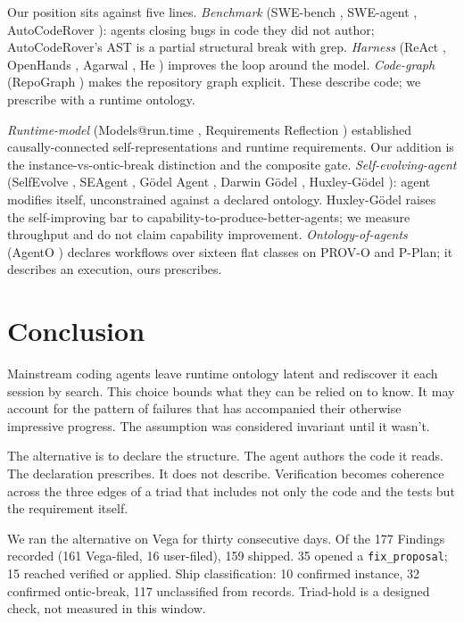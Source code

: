 \documentclass[conference,10pt]{IEEEtran}
\begin{document}
Our position sits against five lines. \emph{Benchmark} (SWE-bench
\cite{swebench2024,swebench2026}, SWE-agent \cite{sweagent2024},
AutoCodeRover \cite{autocoderover2024}): agents closing bugs in code they
did not author; AutoCodeRover's AST is a partial structural break
with grep. \emph{Harness} (ReAct \cite{react2023}, OpenHands \cite{openhands2025},
Agarwal \cite{agarwal2026}, He \cite{he2026cursor}) improves the loop around
the model. \emph{Code-graph} (RepoGraph \cite{repograph2025}) makes the
repository graph explicit. These describe code; we prescribe with a
runtime ontology.

\emph{Runtime-model} (Models@run.time \cite{modelsatruntime2009}, Requirements
Reflection \cite{reqreflection2010}) established causally-connected
self-representations and runtime requirements. Our addition is the
instance-vs-ontic-break distinction and the composite gate. \emph{Self-evolving-agent} (SelfEvolve \cite{selfevolve2026}, SEAgent
\cite{seagent2025}, Gödel Agent \cite{godelagent2025}, Darwin Gödel
\cite{darwingodel2026}, Huxley-Gödel \cite{huxleygodel2026}): agent
modifies itself, unconstrained against a declared ontology.
Huxley-Gödel raises the self-improving bar to
capability-to-produce-better-agents; we measure throughput and do not
claim capability improvement. \emph{Ontology-of-agents} (AgentO
\cite{agento2026}) declares workflows over sixteen flat classes on
PROV-O and P-Plan; it describes an execution, ours prescribes.

\section{Conclusion}\label{sec:conclusion}

Mainstream coding agents leave runtime ontology latent and rediscover
it each session by search. This choice bounds what they can be
relied on to know. It may account for the pattern of failures that has
accompanied their otherwise impressive progress. The assumption was
considered invariant until it wasn't.

The alternative is to declare the structure. The agent authors the code
it reads. The declaration prescribes. It does not describe. Verification
becomes coherence across the three edges of a triad that includes not
only the code and the tests but the requirement itself.

We ran the alternative on Vega for thirty consecutive days. Of the 177
Findings recorded (161 Vega-filed, 16 user-filed), 159 shipped. 35
opened a \texttt{fix\_proposal}; 15 reached verified or applied. Ship
classification: 10 confirmed instance, 32 confirmed ontic-break, 117
unclassified from records. Triad-hold is a designed check, not measured
in this window.
\end{document}
